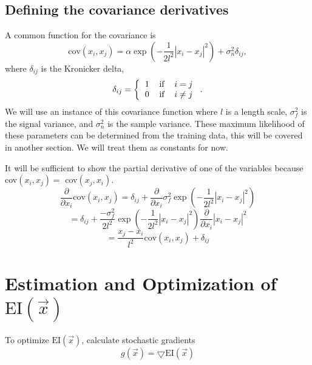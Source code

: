 \documentclass[phd,tocprelim]{cornell}
\begin{document}
\subsection{Defining the covariance derivatives}

A common function for the covariance is
\begin{equation}
    \mbox{cov}(x_{i}, x_{j}) = \alpha \exp\left( -\frac{1}{2l^{2}} |x_{i} - x_{j}|^{2}\right)  + \sigma_{n}^{2}\delta_{ij},
\end{equation}
where $\delta_{ij}$ is the Kronicker delta,
\begin{equation}
    \delta_{ij} = \left\{ \begin{tabular}{ccc}
        1 & if & $i=j$ \\
        0 & if & $i\neq j$
    \end{tabular} \right..
\end{equation}
We will use an instance of this covariance function where $l$ is a length scale, $\sigma_{f}^{2}$ is the signal variance, and $\sigma_{n}^{2}$ is the sample variance. These maximum likelihood of these parameters can be determined from the training data, this will be covered in another section. We will treat them as constants for now.

It will be sufficient to show the partial derivative of one of the variables because cov$(x_{i}, x_{j}) = $ cov$(x_{j}, x_{i})$.
\begin{equation}
    \frac{\partial}{\partial x_{i}} \mbox{cov}(x_{i}, x_{j}) = \delta_{ij} + \frac{\partial}{\partial x_{i}} \sigma_{f}^{2} \exp\left( - \frac{1}{2l^{2}} |x_{i} - x_{j}|^{2}\right)
\end{equation}
\begin{equation}
    =  \delta_{ij} + \frac{-\sigma_{f}^{2}}{2l^{2}} \exp\left( - \frac{1}{2l^{2}} |x_{i} - x_{j}|^{2}\right) \frac{\partial}{\partial x_{i}} |x_{i} - x_{j}|^{2}
\end{equation}
\begin{equation}
    =  \frac{x_{j} - x_{i}}{l^{2}} \mbox{cov}(x_{i}, x_{j}) + \delta_{ij}
\end{equation}

\section{Estimation and Optimization of $\mbox{EI}(\vec{x})$}

To optimize $\mbox{EI}(\vec{x})$, calculate stochastic gradients
\begin{equation}
 g(\vec{x}) = \bigtriangledown \mbox{EI}(\vec{x})
\end{equation}
\end{document}
